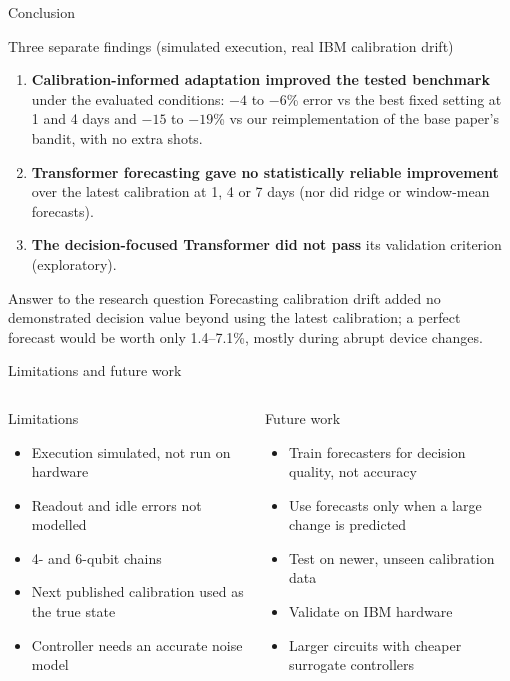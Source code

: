 \documentclass[aspectratio=169,11pt]{beamer}
\begin{document}
\begin{frame}{Conclusion}
\begin{exampleblock}{Three separate findings (simulated execution, real IBM calibration drift)}
\begin{enumerate}
\item \textbf{Calibration-informed adaptation improved the tested benchmark} under the evaluated conditions: $-4$ to $-6$\% error vs the best fixed setting at 1 and 4 days and $-15$ to $-19$\% vs our reimplementation of the base paper's bandit, with no extra shots.
\item \textbf{Transformer forecasting gave no statistically reliable improvement} over the latest calibration at 1, 4 or 7 days (nor did ridge or window-mean forecasts).
\item \textbf{The decision-focused Transformer did not pass} its validation criterion (exploratory).
\end{enumerate}
\end{exampleblock}
\begin{block}{Answer to the research question}
Forecasting calibration drift added no demonstrated decision value beyond using the latest calibration; a perfect forecast would be worth only 1.4--7.1\%, mostly during abrupt device changes.
\end{block}
\end{frame}

\begin{frame}{Limitations and future work}
\begin{columns}[T]
\begin{alertblock}{Limitations}
\begin{itemize}
\item Execution simulated, not run on hardware
\item Readout and idle errors not modelled
\item 4- and 6-qubit chains
\item Next published calibration used as the true state
\item Controller needs an accurate noise model
\end{itemize}
\end{alertblock}
\begin{block}{Future work}
\begin{itemize}
\item Train forecasters for decision quality, not accuracy
\item Use forecasts only when a large change is predicted
\item Test on newer, unseen calibration data
\item Validate on IBM hardware
\item Larger circuits with cheaper surrogate controllers
\end{itemize}
\end{block}
\end{columns}
\end{frame}
\end{document}
